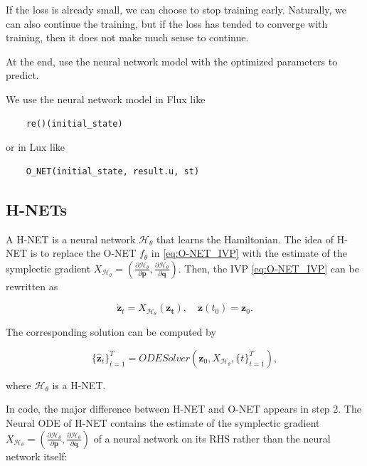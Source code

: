 \documentclass[
	parskip, 			   %
	twoside, 			   %
	DIV=14, 			   %
	BCOR=15.0mm, 		   %
	headsepline, 		   %
	open=right, 		   %
	captions=tableheading, %
	bibliography=totoc,    %
	numbers=noenddot       %
]{scrreprt}
\begin{document}
If the loss is already small, we can choose to stop training early. Naturally, we can also continue the training, but if the loss has tended to converge with training, then it does not make much sense to continue.

At the end, use the neural network model with the optimized parameters to predict.

We use the neural network model in Flux like
\begin{verbatim}
    re()(initial_state)
\end{verbatim}

or in Lux like
\begin{verbatim}
    O_NET(initial_state, result.u, st)
\end{verbatim}


\subsection{H-NETs}
A H-NET is a neural network $\mathcal{H}_{\theta}$ that learns the Hamiltonian. The idea of H-NET is to replace the O-NET $f_{\theta}$ in \ref{eq:O-NET_IVP} with the estimate of the symplectic gradient $X_{\mathcal{H}_{\theta}}=(\frac{\partial \mathcal{H}_{\theta}}{\partial \mathbf{p}}, \frac{\partial \mathcal{H}_{\theta}}{\partial \mathbf{q}})$. Then, the IVP \ref{eq:O-NET_IVP} can be rewritten as

\begin{equation}
    \label{eq:H-NET_IVP}
    \dot{\mathbf{z}}_t = X_{\mathcal{H}_{\theta}}(\mathbf{z_t}), \quad \mathbf{z}(t_{0}) = \mathbf{z}_{0}.
\end{equation}

The corresponding solution can be computed by

\begin{equation}
    \label{eq:H-NET_ODESolver}
     \{ \mathbf{\hat{z}}_{t} \}_{t=1}^{T}  = ODESolver(\mathbf{z}_{0}, X_{\mathcal{H}_{\theta}}, \{ t \}_{t=1}^{T}),
\end{equation}

where $\mathcal{H}_{\theta}$ is a H-NET.

In code, the major difference between H-NET and O-NET appears in step 2. The Neural ODE of H-NET contains the estimate of the symplectic gradient $X_{\mathcal{H}_{\theta}}=(\frac{\partial \mathcal{H}_{\theta}}{\partial \mathbf{p}}, \frac{\partial \mathcal{H}_{\theta}}{\partial \mathbf{q}})$ of a neural network on its RHS rather than the neural network itself:
\end{document}
